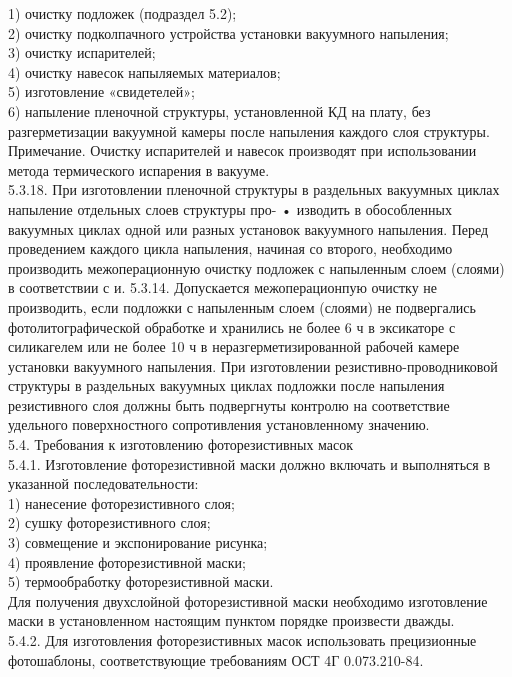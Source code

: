 \documentclass{bmstu}
\begin{document}
	1) очистку подложек (подраздел 5.2); \\
	2) очистку подколпачного устройства установки вакуумного напыления; \\
	3) очистку испарителей; \\
	4) очистку навесок напыляемых материалов; \\
	5) изготовление «свидетелей»; \\
	6) напыление пленочной структуры, установленной КД на плату, без разгерметизации вакуумной  камеры после напыления каждого слоя структуры. \\
	Примечание. Очистку испарителей и навесок производят при использовании метода термического испарения в вакууме. \\
	5.3.18. При изготовлении пленочной структуры в раздельных вакуумных циклах напыление отдельных слоев структуры про- • изводить в обособленных вакуумных циклах одной или разных установок вакуумного напыления. Перед проведением каждого цикла напыления, начиная со второго, необходимо производить межоперационную очистку подложек с напыленным слоем  (слоями)  в соответствии с и. 5.3.14. Допускается межоперационпую очистку не производить, если подложки с напыленным слоем (слоями) не подвергались фотолитографической обработке и хранились не более 6 ч в эксикаторе с силикагелем или не более 10 ч в неразгерметизированной рабочей камере установки вакуумного напыления. При изготовлении резистивно-проводниковой структуры в раздельных вакуумных циклах подложки после напыления резистивного слоя должны быть подвергнуты контролю на соответствие удельного поверхностного сопротивления установленному значению.  \\
	5.4. Требования к изготовлению фоторезистивных масок \\
	5.4.1. Изготовление фоторезистивной маски должно включать и выполняться в указанной последовательности: \\
	1) нанесение фоторезистивного слоя; \\
	2) сушку фоторезистивного слоя; \\
	3) совмещение и экспонирование рисунка; \\
	4) проявление фоторезистивной маски; \\
	5) термообработку фоторезистивной маски. \\
	Для получения двухслойной фоторезистивной маски необходимо изготовление маски в установленном настоящим пунктом порядке произвести дважды. \\
	5.4.2. Для изготовления фоторезистивных масок использовать прецизионные фотошаблоны, соответствующие требованиям ОСТ 4Г 0.073.210-84. \\
\end{document}
